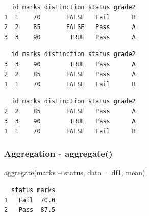 \documentclass[
  letterpaper,
  DIV=11,
  numbers=noendperiod]{scrartcl}
\newenvironment{Shaded}{\begin{snugshade}}{\end{snugshade}}
\newcommand{\AttributeTok}[1]{\textcolor[rgb]{0.40,0.45,0.13}{#1}}
\newcommand{\ConstantTok}[1]{\textcolor[rgb]{0.56,0.35,0.01}{#1}}
\newcommand{\FunctionTok}[1]{\textcolor[rgb]{0.28,0.35,0.67}{#1}}
\newcommand{\NormalTok}[1]{\textcolor[rgb]{0.00,0.23,0.31}{#1}}
\newcommand{\SpecialCharTok}[1]{\textcolor[rgb]{0.37,0.37,0.37}{#1}}
\begin{document}
\begin{verbatim}
  id marks distinction status grade2
1  1    70       FALSE   Fail      B
2  2    85       FALSE   Pass      A
3  3    90        TRUE   Pass      A
\end{verbatim}

\begin{Shaded}
\end{Shaded}

\begin{verbatim}
  id marks distinction status grade2
3  3    90        TRUE   Pass      A
2  2    85       FALSE   Pass      A
1  1    70       FALSE   Fail      B
\end{verbatim}

\begin{Shaded}
\end{Shaded}

\begin{verbatim}
  id marks distinction status grade2
2  2    85       FALSE   Pass      A
3  3    90        TRUE   Pass      A
1  1    70       FALSE   Fail      B
\end{verbatim}

\subsubsection{Aggregation - aggregate()}\label{aggregation---aggregate}

\begin{Shaded}
\begin{Highlighting}[]
\FunctionTok{aggregate}\NormalTok{(marks }\SpecialCharTok{\textasciitilde{}}\NormalTok{ status, }\AttributeTok{data =}\NormalTok{ df1, mean)}
\end{Highlighting}
\end{Shaded}

\begin{verbatim}
  status marks
1   Fail  70.0
2   Pass  87.5
\end{verbatim}
\end{document}

